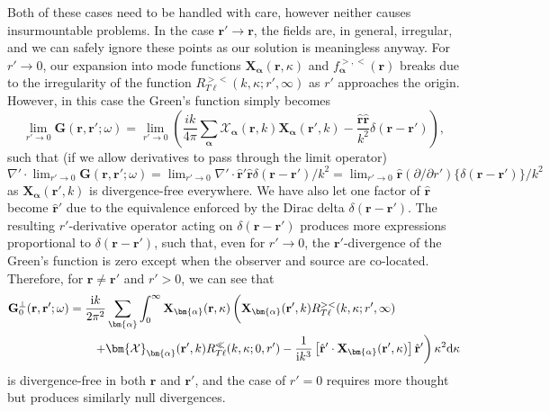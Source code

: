Both of these cases need to be handled with care, however neither causes insurmountable problems. In the case $\mathbf{r}'\to\mathbf{r}$, the fields are, in general, irregular, and we can safely ignore these points as our solution is meaningless anyway. For $r'\to0$, our expansion into mode functions $\mathbf{X}_{\bm{\alpha}}(\mathbf{r},\kappa)$ and $f_{\bm{\alpha}}^{>,<}(\mathbf{r})$ breaks due to the irregularity of the function $R_{T\ell}^{><}(k,\kappa;r',\infty)$ as $r'$ approaches the origin. However, in this case the Green's function simply becomes
\begin{equation}
\lim_{r'\to0}\mathbf{G}(\mathbf{r},\mathbf{r}';\omega) = \lim_{r'\to0}\left(\frac{ik}{4\pi}\sum_{\bm{\alpha}}\bm{\mathcal{X}}_{\bm{\alpha}}(\mathbf{r},k)\mathbf{X}_{\bm{\alpha}}(\mathbf{r}',k) - \frac{\hat{\mathbf{r}}\hat{\mathbf{r}}}{k^2}\delta(\mathbf{r} - \mathbf{r}')\right),
\end{equation}
such that (if we allow derivatives to pass through the limit operator) $\nabla'\cdot\lim_{r'\to0}\mathbf{G}(\mathbf{r},\mathbf{r}';\omega) = \lim_{r'\to0}\nabla'\cdot\hat{\mathbf{r}}'\hat{\mathbf{r}}\delta(\mathbf{r} - \mathbf{r}')/k^2 = \lim_{r'\to0}\hat{\mathbf{r}}(\partial/\partial r')\{\delta(\mathbf{r} - \mathbf{r}')\}/k^2$ as $\mathbf{X}_{\bm{\alpha}}(\mathbf{r}',k)$ is divergence-free everywhere. We have also let one factor of $\hat{\mathbf{r}}$ become $\hat{\mathbf{r}}'$ due to the equivalence enforced by the Dirac delta $\delta(\mathbf{r} - \mathbf{r}')$. The resulting $r'$-derivative operator acting on $\delta(\mathbf{r} - \mathbf{r}')$ produces more expressions proportional to $\delta(\mathbf{r} - \mathbf{r}')$, such that, even for $r'\to 0$, the $\mathbf{r}'$-divergence of the Green's function is zero except when the observer and source are co-located. Therefore, for $\mathbf{r} \neq \mathbf{r}'$ and $r'>0$, we can see that
\begin{equation}\label{eq:G0transverse}
\begin{split}
\mathbf{G}_0^\perp(\mathbf{r},\mathbf{r}';\omega) &= \frac{\mathrm{i}k}{2\pi^2}\sum_{\bm{\alpha}}\int_0^\infty\mathbf{X}_{\bm{\alpha}}(\mathbf{r},\kappa)\left( \vphantom{\frac{1}{4\pi k^2}} \mathbf{X}_{\bm{\alpha}}(\mathbf{r}',k)R_{T\ell}^{><}(k,\kappa;r',\infty)\right.\\
&\qquad\left.+ \bm{\mathcal{X}}_{\bm{\alpha}}(\mathbf{r}',k)R_{T\ell}^\ll(k,\kappa;0,r') - \frac{1}{\mathrm{i} k^3}\left[\hat{\mathbf{r}}'\cdot\mathbf{X}_{\bm{\alpha}}(\mathbf{r}',\kappa)\right]\hat{\mathbf{r}}'\right)\kappa^2\mathrm{d}\kappa
\end{split}
\end{equation}
is divergence-free in both $\mathbf{r}$ and $\mathbf{r}'$, and the case of $r' = 0$ requires more thought but produces similarly null divergences.


